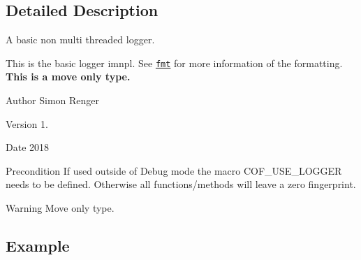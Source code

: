 \subsection{Detailed Description}
A basic non multi threaded logger. 

This is the basic logger imnpl. See \href{https://github.com/fmtlib/fmt/}{\tt fmt} for more information of the formatting. {\bfseries This is a move only type.} \begin{DoxyAuthor}{Author}
Simon Renger 
\end{DoxyAuthor}
\begin{DoxyVersion}{Version}
1. 
\end{DoxyVersion}
\begin{DoxyDate}{Date}
2018 
\end{DoxyDate}
\begin{DoxyPrecond}{Precondition}
If used outside of Debug mode the macro {\ttfamily C\+O\+F\+\_\+\+U\+S\+E\+\_\+\+L\+O\+G\+G\+ER} needs to be defined. Otherwise all functions/methods will leave a zero fingerprint. 
\end{DoxyPrecond}
\begin{DoxyWarning}{Warning}
Move only type. 
\end{DoxyWarning}
\hypertarget{classcof_1_1basic__logger_1_1_logger_example}{}\subsection{Example}\label{classcof_1_1basic__logger_1_1_logger_example}

